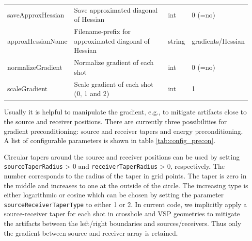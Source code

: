 \documentclass[pdftex,a4paper,parskip,listof=totoc,bibliography=totoc,onehalfspacing,12pt]{scrreprt}
\begin{document}
\begin{table}[h!]
\begin{adjustbox}{width=1\textwidth,center=\textwidth}
\begin{tabular}{llll}
         saveApproxHessian        & Save approximated diagonal of Hessian                               &  int   & 0 (=no) \\
         approxHessianName        & Filename-prefix for approximated diagonal of Hessian                   & string & gradients/Hessian \\
         normalizeGradient        & Normalize gradient of each shot                                     &  int   & 0 (=no) \\
         scaleGradient        & Scale gradient of each shot (0, 1 and 2)                                     &  int   & 1 \\
	\bottomrule
	\end{tabular}
	\end{adjustbox}
\end{table}
Usually it is helpful to manipulate the gradient, e.g., to mitigate artifacts close to the source and receiver positions. There are currently three possibilities for gradient preconditioning: source and receiver tapers and energy preconditioning. A list of configurable parameters is shown in table \ref{tab:config_precon}.

Circular tapers around the source and receiver positions can be used by setting \verb+sourceTaperRadius+ > 0 and \verb+receiverTaperRadius+ > 0, respectively. The number corresponds to the radius of the taper in grid points. The taper is zero in the middle and increases to one at the outside of the circle. The increasing type is either logarithmic or cosine which can be chosen by setting the parameter \verb+sourceReceiverTaperType+ to either 1 or 2. In current code, we implicitly apply a source-receiver taper for each shot in crosshole and VSP geometries to mitigate the artifacts between the left/right boundaries and sources/receivers. Thus only the gradient between source and receiver array is retained.
\end{document}
